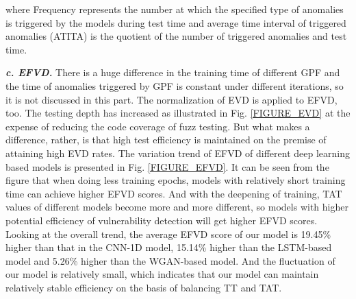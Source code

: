 where Frequency represents the number at which the specified type of anomalies is triggered by the models during test time and average time interval of triggered anomalies (ATITA) is the quotient of the number of triggered anomalies and test time.

\quad \textit{\textbf{c. EFVD.}}
There is a huge difference in the training time of different GPF and the time of anomalies triggered by GPF is constant under different iterations, so it is not discussed in this part. The normalization of EVD is applied to EFVD, too. The testing depth has increased as illustrated in Fig. \ref{FIGURE_EVD} at the expense of reducing the code coverage of fuzz testing. But what makes a difference, rather, is that high test efficiency is maintained on the premise of attaining high EVD rates. The variation trend of EFVD of different deep learning based models is presented in Fig. \ref{FIGURE_EFVD}. It can be seen from the figure that when doing less training epochs, models with relatively short training time can achieve higher EFVD scores. And with the deepening of training, TAT values of different models become more and more different, so models with higher potential efficiency of vulnerability detection will get higher EFVD scores. Looking at the overall trend, the average EFVD score of our model is 19.45\% higher than that in the CNN-1D model, 15.14\% higher than the LSTM-based model and 5.26\% higher than the WGAN-based model. And the fluctuation of our model is relatively small, which indicates that our model can maintain relatively stable efficiency on the basis of balancing TT and TAT.






